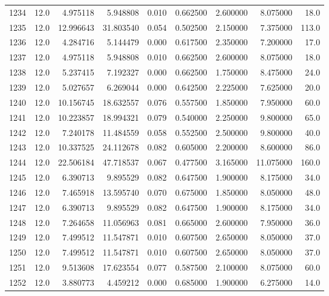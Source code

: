 \begin{tabular}{lrrrrrrrr}
1234 &   12.0 &   4.975118 &   5.948808 &  0.010 &  0.662500 &  2.600000 &   8.075000 &   18.0 \\
1235 &   12.0 &  12.996643 &  31.803540 &  0.054 &  0.502500 &  2.150000 &   7.375000 &  113.0 \\
1236 &   12.0 &   4.284716 &   5.144479 &  0.000 &  0.617500 &  2.350000 &   7.200000 &   17.0 \\
1237 &   12.0 &   4.975118 &   5.948808 &  0.010 &  0.662500 &  2.600000 &   8.075000 &   18.0 \\
1238 &   12.0 &   5.237415 &   7.192327 &  0.000 &  0.662500 &  1.750000 &   8.475000 &   24.0 \\
1239 &   12.0 &   5.027657 &   6.269044 &  0.000 &  0.642500 &  2.225000 &   7.625000 &   20.0 \\
1240 &   12.0 &  10.156745 &  18.632557 &  0.076 &  0.557500 &  1.850000 &   7.950000 &   60.0 \\
1241 &   12.0 &  10.223857 &  18.994321 &  0.079 &  0.540000 &  2.250000 &   9.800000 &   65.0 \\
1242 &   12.0 &   7.240178 &  11.484559 &  0.058 &  0.552500 &  2.500000 &   9.800000 &   40.0 \\
1243 &   12.0 &  10.337525 &  24.112678 &  0.082 &  0.605000 &  2.200000 &   8.600000 &   86.0 \\
1244 &   12.0 &  22.506184 &  47.718537 &  0.067 &  0.477500 &  3.165000 &  11.075000 &  160.0 \\
1245 &   12.0 &   6.390713 &   9.895529 &  0.082 &  0.647500 &  1.900000 &   8.175000 &   34.0 \\
1246 &   12.0 &   7.465918 &  13.595740 &  0.070 &  0.675000 &  1.850000 &   8.050000 &   48.0 \\
1247 &   12.0 &   6.390713 &   9.895529 &  0.082 &  0.647500 &  1.900000 &   8.175000 &   34.0 \\
1248 &   12.0 &   7.264658 &  11.056963 &  0.081 &  0.665000 &  2.600000 &   7.950000 &   36.0 \\
1249 &   12.0 &   7.499512 &  11.547871 &  0.010 &  0.607500 &  2.650000 &   8.050000 &   37.0 \\
1250 &   12.0 &   7.499512 &  11.547871 &  0.010 &  0.607500 &  2.650000 &   8.050000 &   37.0 \\
1251 &   12.0 &   9.513608 &  17.623554 &  0.077 &  0.587500 &  2.100000 &   8.075000 &   60.0 \\
1252 &   12.0 &   3.880773 &   4.459212 &  0.000 &  0.685000 &  1.900000 &   6.275000 &   14.0 \\

\end{tabular}
